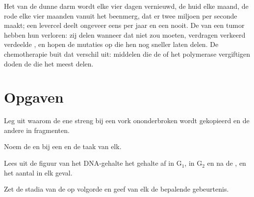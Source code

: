 \begin{example}[Vernieuwing]\label{ex:b1:replication-mitosis:turnover}
Het  van de dunne darm wordt elke vier dagen vernieuwd, de huid elke maand,
de rode  elke vier maanden vanuit het beenmerg, dat er twee miljoen per
seconde maakt; een levercel deelt ongeveer eens per jaar en een  nooit. De
 van een tumor hebben hun  verloren: zij delen wanneer dat niet
zou moeten, verdragen verkeerd verdeelde , en hopen de mutaties op die
hen nog sneller laten delen. De chemotherapie buit dat verschil uit: middelen die
de  of het polymerase vergiftigen doden de  die het meest delen.
\end{example}

\section{Opgaven}

\begin{exercise}[$\star$]\label{exo:b1:replication-mitosis:1}
Leg uit waarom de ene streng bij een vork ononderbroken wordt gekopieerd en de
andere in fragmenten.
\end{exercise}

\begin{exercise}[$\star$]\label{exo:b1:replication-mitosis:2}
Noem de  en  bij een  en de taak van elk.
\end{exercise}

\begin{exercise}[$\star$]\label{exo:b1:replication-mitosis:3}
Lees uit de figuur van het DNA-gehalte het gehalte af in G$_1$, in G$_2$ en na de
, en het aantal  in elk geval.
\end{exercise}

\begin{exercise}[$\star$]\label{exo:b1:replication-mitosis:4}
Zet de stadia van de  op volgorde en geef van elk de bepalende gebeurtenis.
\end{exercise}

